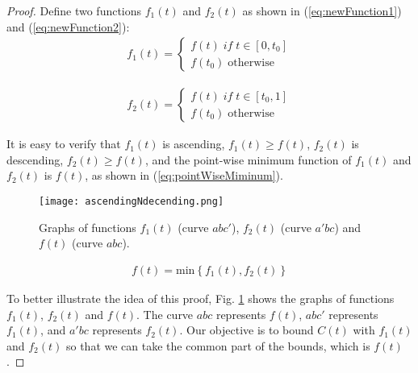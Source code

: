\begin{proof}
Define two functions $f_{1}(t)$ and $f_{2}(t)$ as shown in (\ref{eq:newFunction1}) and (\ref{eq:newFunction2}):
\begin{equation}\begin{split}
f_{1}(t) = \left\{
\begin{array}{l}
f(t) \; if \; t \in \left[0, t_{0}\right] \\
f(t_{0}) \; \text{otherwise}
\end{array}
\right.  
\label{eq:newFunction1}
\end{split}\end{equation}

\begin{equation}\begin{split}
f_{2}(t) = \left\{
\begin{array}{l}
f(t) \; if \; t \in \left[t_{0}, 1\right] \\
f(t_{0}) \; \text{otherwise}
\end{array}
\right.  
\label{eq:newFunction2}
\end{split}\end{equation}

It is easy to verify that $f_{1}(t)$ is ascending, $f_{1}(t) \ge f(t)$, $f_{2}(t)$ is descending, $f_{2}(t) \ge f(t)$, and the point-wise minimum function of $f_{1}(t)$ and $f_{2}(t)$ is $f(t)$, as shown in (\ref{eq:pointWiseMiminum}).

\begin{figure}[tbp]
\begin{center}
\texttt{[image: ascendingNdecending.png]}
\end{center}
\vspace{-0.2 in}
\caption{Graphs of functions $f_{1}(t)$ (curve $abc'$), $f_{2}(t)$ (curve $a'bc$) and $f(t)$ (curve $abc$).}
\label{Fig:ascendingNdecending}
\vspace{-0.2 in}
\end{figure}

\begin{equation}\begin{split}
f(t) = \text{min} \left\{f_{1}(t), f_{2}(t)\right\}
\label{eq:pointWiseMiminum}
\end{split}\end{equation}

To better illustrate the idea of this proof, Fig. \ref{Fig:ascendingNdecending} shows the graphs of functions $f_{1}(t)$, $f_{2}(t)$ and $f(t)$. The curve $abc$ represents $f(t)$, $abc'$ represents $f_{1}(t)$, and $a'bc$ represents $f_{2}(t)$. Our objective is to bound $C(t)$ with $f_{1}(t)$ and $f_{2}(t)$ so that we can take the common part of the bounds, which is $f(t)$.


\end{proof}
